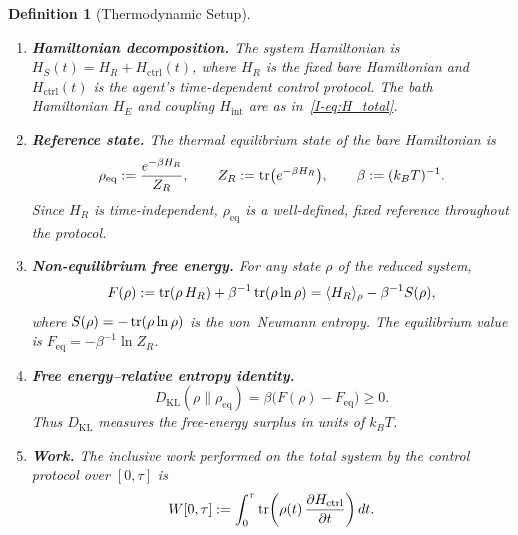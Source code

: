 \documentclass[12pt,a4paper,openany]{book}
\newtheorem{definition}[theorem]{Definition}
\begin{document}
\begin{definition}[Thermodynamic Setup]
\label{I-def:thermo_setup}
\leavevmode
\begin{enumerate}
\item \textbf{Hamiltonian decomposition.}
  The system Hamiltonian is
  $H_S(t) = H_R + H_{\mathrm{ctrl}}(t)$,
  where $H_R$ is the \emph{fixed} bare Hamiltonian and
  $H_{\mathrm{ctrl}}(t)$ is the agent's time-dependent
  control protocol.
  The bath Hamiltonian $H_E$ and coupling $H_{\mathrm{int}}$
  are as in~\eqref{I-eq:H_total}.

\item \textbf{Reference state.}
  The thermal equilibrium state of the bare Hamiltonian is
  \begin{equation}
  \label{I-eq:rho_eq}
  \rho_{\mathrm{eq}} := \frac{e^{-\beta H_R}}{Z_R},
  \qquad Z_R := \tr(e^{-\beta H_R}),
  \qquad \beta := (k_B T)^{-1}.
  \end{equation}
  Since $H_R$ is time-independent, $\rho_{\mathrm{eq}}$ is a
  well-defined, fixed reference throughout the protocol.

\item \textbf{Non-equilibrium free energy.}
  For any state $\rho$ of the reduced system,
  \begin{equation}
  \label{I-eq:F_neq}
  F(\rho) := \tr(\rho\, H_R) + \beta^{-1}\tr(\rho\ln\rho)
  = \langle H_R \rangle_\rho - \beta^{-1} S(\rho),
  \end{equation}
  where $S(\rho) = -\tr(\rho\ln\rho)$ is the von~Neumann entropy.
  The equilibrium value is $F_{\mathrm{eq}} = -\beta^{-1}\ln Z_R$.

\item \textbf{Free energy--relative entropy identity.}
  \begin{equation}
  \label{I-eq:DKL_F}
  D_{\mathrm{KL}}(\rho \| \rho_{\mathrm{eq}})
  = \beta\bigl(F(\rho) - F_{\mathrm{eq}}\bigr) \geq 0.
  \end{equation}
  Thus $D_{\mathrm{KL}}$ measures the free-energy surplus in
  units of $k_B T$.

\item \textbf{Work.}
  The inclusive work performed on the total system by the control protocol
  over $[0,\tau]$ is
  \begin{equation}
  \label{I-eq:work}
  W[0,\tau] := \int_0^\tau
  \tr\!\left(\rho(t)\,
  \frac{\partial H_{\mathrm{ctrl}}}{\partial t}\right) dt.
  \end{equation}


\end{enumerate}
\end{definition}
\end{document}
